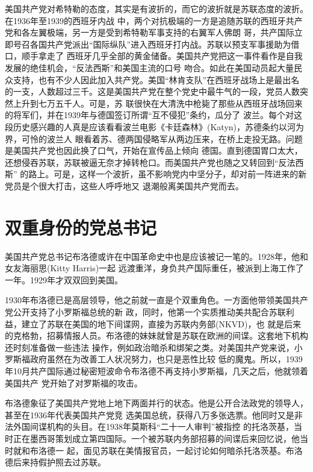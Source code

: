 \documentclass[10pt]{article}
\begin{document}
{美国共产党对希特勒的态度，其实是有波折的，而它的波折就是苏联态度的波折。在1936年至1939的西班牙内战
中，两个对抗极端的一方是追随苏联的西班牙共产党和各左翼极端，另一方是受到希特勒军事支持的右翼军人佛朗
哥，共产国际立即号召各国共产党派出``国际纵队''进入西班牙打内战。苏联以预支军事援助为借口，顺手拿走了
西班牙几乎全部的黄金储备。美国共产党把这一事件看作是自我发展的绝佳机会，``反法西斯''和美国主流的口号
吻合。如此在美国动员起大量民众支持，也有不少人因此加入共产党。美国``林肯支队''在西班牙战场上是最出名
的一支，人数超过三千。这是美国共产党在整个党史中最牛气的一段，党员人数突然上升到七万五千人。可是，苏
联很快在大清洗中枪毙了那些从西班牙战场回来的将军们，并在1939年与德国签订所谓``互不侵犯''条约，瓜分了
波兰。每个对这段历史感兴趣的人真是应该看看波兰电影《卡廷森林》(Katyn)，苏德条约以河为界，可怜的波兰人
眼看着苏、德两国侵略军从两边压来，在桥上走投无路。问题是美国共产党也因此换了口气，开始在宣传品上倾向
德国。直到德国胃口太大，还想侵吞苏联，苏联被逼无奈才掉转枪口。而美国共产党也随之又转回到``反法西斯''
的路上。可是，这样一个波折，虽不影响党内中坚分子，却对前一阵进来的新党员是个很大打击，这些人呼呼地又
退潮般离美国共产党而去。


\pagebreak
\section{双重身份的党总书记}

美国共产党总书记布洛德或许在中国革命史中也是应该被记一笔的。1928年，他和女友海丽思(Kitty Harris)一起
远渡重洋，身负共产国际重任，被派到上海工作了一年。1929年才双双回到美国。

1930年布洛德已是高层领导，他之前就一直是个双重角色。一方面他带领美国共产党公开支持了小罗斯福总统的新
政，同时，他第一个实质推动美共配合苏联利益，建立了苏联在美国的地下间谍网，直接为苏联内务部(NKVD)，也
就是后来的克格勃，招募情报人员。布洛德的妹妹就曾是苏联在欧洲的间谍。这套地下机构还时刻准备做一些违法
操作，例如政治暗杀和绑架之类。对美国共产党来说，小罗斯福政府虽然在为改善工人状况努力，也只是恶性比较
低的魔鬼。所以，1939年10月共产国际通过秘密短波命令布洛德不再支持小罗斯福，几天之后，他就领着美国共产
党开始了对罗斯福的攻击。

布洛德象征了美国共产党地上地下两面并行的状态。他是公开合法政党的领导人，甚至在1936年代表美国共产党竞
选美国总统，获得八万多张选票。他同时又是非法外国间谍机构的头目。在1938年莫斯科``二十一人审判''被指控
的托洛茨基，当时正在墨西哥策划成立第四国际。一个被苏联内务部招募的间谍后来回忆说，他当时就和布洛德一
起，面见苏联在美情报官员，一起讨论如何暗杀托洛茨基。布洛德后来持假护照去过苏联。

}
\end{document}
